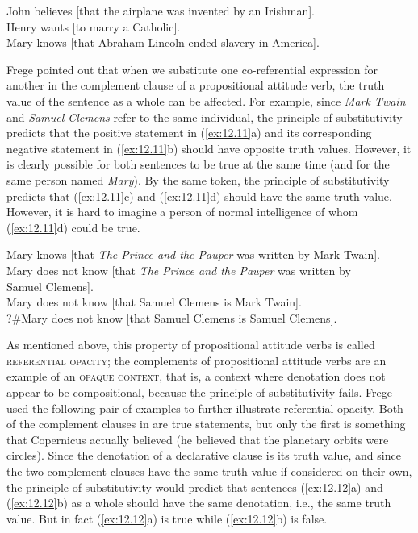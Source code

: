 \ea \label{ex:12.10}
\ea John believes [that the airplane was invented by an Irishman].\\
\ex Henry wants [to marry a Catholic].\\
\ex Mary knows [that Abraham Lincoln ended slavery in America].
                       \z
\z


Frege pointed out that when we substitute one co-referential expression for another in the complement clause of a propositional attitude verb, the truth value of the sentence as a whole can be affected. For example, since \textit{Mark Twain} and \textit{Samuel Clemens} refer to the same individual, the principle of substitutivity predicts that the positive statement in (\ref{ex:12.11}a) and its corresponding negative statement in (\ref{ex:12.11}b) should have opposite truth values. However, it is clearly possible for both sentences to be true at the same time (and for the same person named \textit{Mary}). By the same token, the principle of substitutivity predicts that (\ref{ex:12.11}c) and (\ref{ex:12.11}d) should have the same truth value. However, it is hard to imagine a person of normal intelligence of whom (\ref{ex:12.11}d) could be true.


\ea \label{ex:12.11}
\ea Mary knows [that \textit{The Prince and the Pauper} was written by Mark Twain].\\
\ex Mary does not know [that \textit{The Prince and the Pauper} was written by\\
  Samuel Clemens].\\
\ex Mary does not know [that Samuel Clemens is Mark Twain].\\
\ex ?\#Mary does not know [that Samuel Clemens is Samuel Clemens].
                       \z
\z


As mentioned above, this property of propositional attitude verbs is called \textsc{referential opacity}; the complements of propositional attitude verbs are an example of an \textsc{opaque context}, that is, a context where denotation does not appear to be compositional, because the principle of substitutivity fails. Frege used the following pair of examples to further illustrate referential opacity. Both of the complement clauses in  are true statements, but only the first is something that Copernicus actually believed (he believed that the planetary orbits were circles). Since the denotation of a declarative clause is its truth value, and since the two complement clauses have the same truth value if considered on their own, the principle of substitutivity would predict that sentences (\ref{ex:12.12}a) and (\ref{ex:12.12}b) as a whole should have the same denotation, i.e., the same truth value. But in fact (\ref{ex:12.12}a) is true while (\ref{ex:12.12}b) is false.


